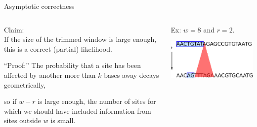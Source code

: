 \documentclass[smaller]{beamer}
\begin{document}
\begin{frame}{Asymptotic correctness}
  \begin{columns}[c]
    \begin{column}{.4\textwidth}

  {\struct Claim:} \\
  If the size of the trimmed window is large enough, this is a {\newthing correct} (partial) likelihood.

  \vspace{2em}

  {\struct ``Proof:''}
  The probability that a site has been affected by another more than $k$ bases away decays geometrically,

  \vspace{2em}

  so if $w-r$ is large enough, the number of sites for which we should have included information from sites outside $w$ is small.

    \end{column}
    \begin{column}{.6\textwidth}

      Ex: $w=8$ and $r=2$.

  \vspace{1em}

  \includegraphics{../../../writeup-plots/talk-dependency-proof-fig}

    \end{column}
  \end{columns}

\end{frame}
\end{document}
